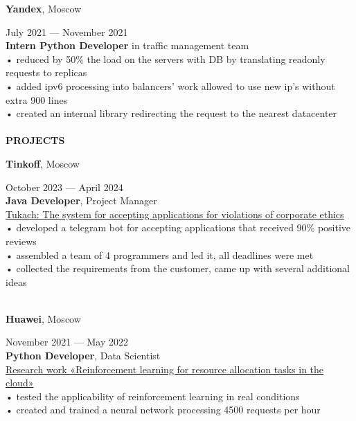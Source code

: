 \documentclass{article}
\begin{document}
\begin{vwcol}[widths={0.8,0.2},
 sep=.8cm, justify=flush,rule=0pt,indent=1em]
\begin{Large}
\textbf{Yandex}, Moscow
\end{Large}
\hspace{190pt}July 2021 — November 2021\\
\textbf{Intern Python Developer} in traffic management team\\
• reduced by 50\% the load on the servers with DB by translating readonly requests to replicas\\
• added ipv6 processing into balancers’ work allowed to use new ip’s without extra 900 lines\\
• created an internal library redirecting the request to the nearest datacenter\\
\\
\noindent\textcolor[rgb]{0.1255,0.2902,0.7843}{\textbf{\Large{PROJECTS}}}\\
\begin{Large}
\textbf{Tinkoff}, Moscow
\end{Large}
\hspace{200pt}October 2023 — April 2024\\
\textbf{Java Developer}, Project Manager\\
\href{https://github.com/NikPeg/TukachBot}{Tukach: The system for accepting applications for violations of corporate ethics}\\
• developed a telegram bot for accepting applications that received 90\% positive reviews\\
• assembled a team of 4 programmers and led it, all deadlines were met\\
• collected the requirements from the customer, came up with several additional ideas\\
\\
\begin{Large}
\textbf{Huawei}, Moscow
\end{Large}
\hspace{190pt}November 2021 — May 2022\\
\textbf{Python Developer}, Data Scientist\\
\href{https://github.com/NikPeg/Reinforcement-learning-for-resource-allocation-tasks-in-the-cloud}{Research work «Reinforcement learning for resource allocation tasks in the cloud»}\\
• tested the applicability of reinforcement learning in real conditions\\
• created and trained a neural network processing 4500 requests per hour\\

\end{vwcol}
\end{document}
